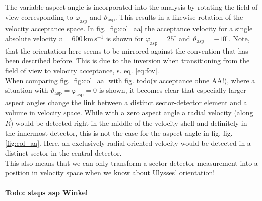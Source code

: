 %
%
%
The variable aspect angle is incorporated into the analysis by rotating the field of view corresponding to $\varphi_{\mathrm{asp}}$ and $\vartheta_{\mathrm{asp}}$. This results in a likewise rotation of the velocity acceptance space. In fig. \ref{fig:col_aa} the acceptance velocity for a single absolute velocity $v = 600\,\mathrm{km\,s^{-1}}$ is shown for $\varphi_\mathrm{asp} = 25^\circ$ and $\vartheta_{\mathrm{asp}} = -10^\circ $. Note, that the orientation here seems to be mirrored against the convention that has been described before. This is due to the inversion when transitioning from the field of view to velocity acceptance, s. eq. \ref{eq:fov}.\\
When comparing fig. \ref{fig:col_aa} with fig. todo(v acceptance ohne AA!), where a situation with $\vartheta_{\mathrm{asp}} = \varphi_{\mathrm{asp}} = 0$ is shown, it becomes clear that especially larger aspect angles change the link between a distinct sector-detector element and a volume in velocity space. While with a zero aspect angle a radial velocity (along $\vec{R}$) would be detected right in the middle of the velocity shell and definitely in the innermost detector, this is not the case for the aspect angle in fig. fig. \ref{fig:col_aa}. Here, an exclusively radial oriented velocity would be detected in a distinct sector in the central detector.\\
This also means that we can only transform a sector-detector measurement into a position in velocity space when we know about Ulysses' orientation!
\\ \\
\textbf{Todo: steps asp Winkel}
